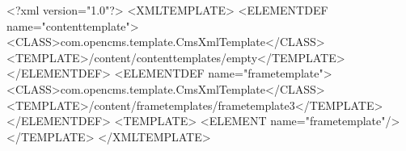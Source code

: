 <?xml version="1.0"?> <XMLTEMPLATE>
    <ELEMENTDEF name="contenttemplate">
        <CLASS>com.opencms.template.CmsXmlTemplate</CLASS>
        <TEMPLATE>/content/contenttemplates/empty</TEMPLATE>
    </ELEMENTDEF>
    <ELEMENTDEF name="frametemplate">
        <CLASS>com.opencms.template.CmsXmlTemplate</CLASS>
        <TEMPLATE>/content/frametemplates/frametemplate3</TEMPLATE>
    </ELEMENTDEF>
<TEMPLATE> <ELEMENT name="frametemplate"/> </TEMPLATE>
</XMLTEMPLATE>
